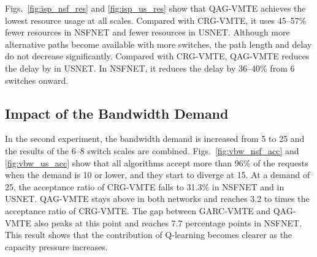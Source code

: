 Figs.~\ref{fig:isp_nsf_res} and \ref{fig:isp_us_res} show that QAG-VMTE achieves the lowest resource usage at all scales. Compared with CRG-VMTE, it uses 45--57\% fewer resources in NSFNET and  fewer resources in USNET. Although more alternative paths become available with more switches, the path length and delay do not decrease significantly.  Compared with CRG-VMTE, QAG-VMTE reduces the delay by  in USNET. In NSFNET, it reduces the delay by 36--40\% from 6 switches onward. 

\subsection{Impact of the Bandwidth Demand}
\label{subsec:vbw}

In the second experiment, the bandwidth demand is increased from 5 to 25 and the results of the 6--8 switch scales are combined. Figs.~\ref{fig:vbw_nsf_acc} and \ref{fig:vbw_us_acc} show that all algorithms accept more than 96\% of the requests when the demand is 10 or lower, and they start to diverge at 15. At a demand of 25, the acceptance ratio of CRG-VMTE falls to 31.3\% in NSFNET and  in USNET. QAG-VMTE stays above  in both networks and reaches 3.2 to  times the acceptance ratio of CRG-VMTE. The gap between GARC-VMTE and QAG-VMTE also peaks at this point and reaches 7.7 percentage points in NSFNET. This result shows that the contribution of Q-learning becomes clearer as the capacity pressure increases.

